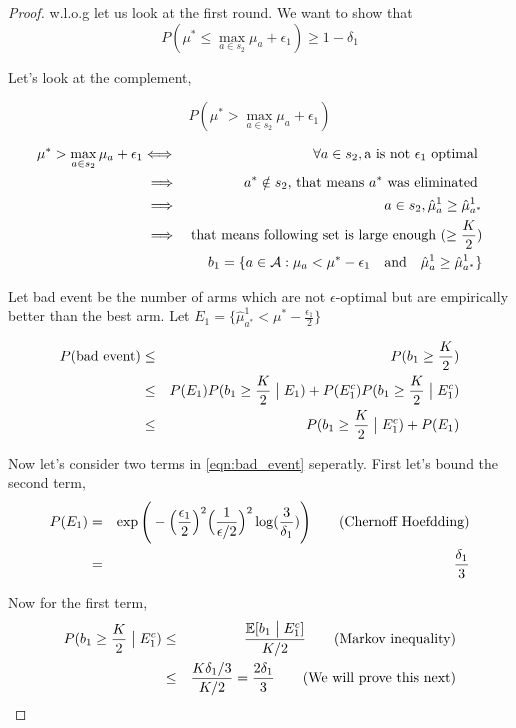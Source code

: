 \documentclass[11pt]{article}
\begin{document}
\begin{proof}
	w.l.o.g let us look at the first round. We want to show that 
	\[ P(\mu^* \leq \max_{a \in s_2} \mu_a + \epsilon_1) \geq 1 - \delta_1\] 
	
	
	Let's look at the complement,
	
	\[ P(\mu^* > \max_{a \in s_2} \mu_a + \epsilon_1)  \]
	
	\begin{eqnarray*}
		\mu^* > \max_{a \in s_2} \mu_a + \epsilon_1 &\Longleftrightarrow& \forall a \in s_2, \textnormal{a is not $\epsilon_1$ optimal } \\ 
		&\implies& \textnormal{ $a^*  \notin s_2 $, that means $a^*$ was eliminated }\\
		&\implies&  a \in s_2 , \hat{\mu}_a^1 \geq \hat{\mu}^{1}_{a^*}\\
		&\implies&  \textnormal{that means following set is large enough ($ \geq \frac{K}{2}$)} \\
		& & b_1 = \{ a \in \mathcal{A}: \mu_a < \mu^* - \epsilon_1  \quad \textrm{and} \quad   \hat{\mu}_a^1 \geq \hat{\mu}^1_{a^*} \}
	\end{eqnarray*}
	
	Let bad event be the number of arms which are not $\epsilon$-optimal but are empirically	better than the best arm.
	Let $ E_1 = \{ \hat{\mu}^1_{a^*} < \mu^* - \frac{\epsilon_1}{2} \}$
	
	\begin{eqnarray}
		\label{eqn:bad_event}
		\nonumber P(\textnormal{bad event}) &\leq& P(b_1 \geq \frac{K}{2})\\
	\nonumber 	& \leq & P(E_1) P(b_1 \geq \frac{K}{2} \bigm| E_1) + P(E_1^c) P(b_1 \geq \frac{K}{2}  \bigm| E_1^c ) \\
		& \leq &   P(b_1 \geq \frac{K}{2}  \bigm| E_1^c )  + P(E_1)
	\end{eqnarray}


Now let's consider two terms in \eqref{eqn:bad_event} seperatly. First let's bound the second term,
\begin{eqnarray}
	\label{eqn:second_term}
	\nonumber P(E_1) &=& \exp\Bigg(-\Big(\frac{\epsilon_1}{2}\Big)^2 \Big(\frac{1}{\epsilon /2}\Big)^2 \log (\frac{3}{\delta_1})\Bigg) \quad \quad \textnormal{(Chernoff Hoefdding)}\\
	&=& \frac{\delta_1}{3}
\end{eqnarray}

Now for the first term,
\begin{eqnarray}
	\label{eqn:first_term}
	 \nonumber P(b_1 \geq \frac{K}{2} \bigm| E^c_1) &\leq& \frac{\mathbb{E}[b_1 \bigm| E_1^c]}{K/2} \quad \quad \textnormal{(Markov inequality)} \\
	& \leq & \frac{K \delta_1/3}{K/2} = \frac{2\delta_1}{3} \quad \quad \textnormal{(We will prove this next)}
\end{eqnarray}


\end{proof}
\end{document}

